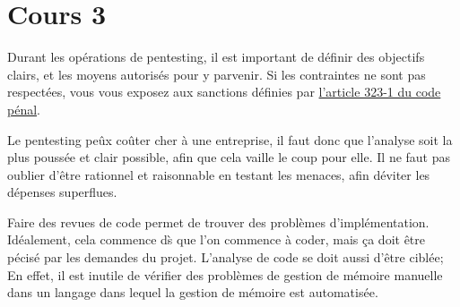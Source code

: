 \section{Cours 3}
Durant les op\'erations de pentesting, il est important de d\'efinir des objectifs clairs, et les moyens autoris\'es pour
y parvenir.
Si les contraintes ne sont pas respect\'ees, vous vous exposez aux sanctions d\'efinies par
\href{https://www.legifrance.gouv.fr/codes/article_lc/LEGIARTI000030939438?isSuggest=true}{l'article 323-1 du code
p\'enal}.

Le pentesting pe\^ux co\^uter cher \`a une entreprise, il faut donc que l'analyse soit la plus pouss\'ee et clair
possible, afin que cela vaille le coup pour elle. Il ne faut pas oublier d'\^etre rationnel et raisonnable en testant
les menaces, afin d\'eviter les d\'epenses superflues.

Faire des revues de code permet de trouver des probl\`emes d'impl\'ementation. Id\'ealement, cela commence d\`s que l'on
commence \`a coder, mais \c ca doit \^etre p\'ecis\'e par les demandes du projet.
L'analyse de code se doit aussi d'\^etre cibl\'ee; En effet, il est inutile de v\'erifier des probl\`emes de gestion de
m\'emoire manuelle dans un langage dans lequel la gestion de m\'emoire est automatis\'ee.

